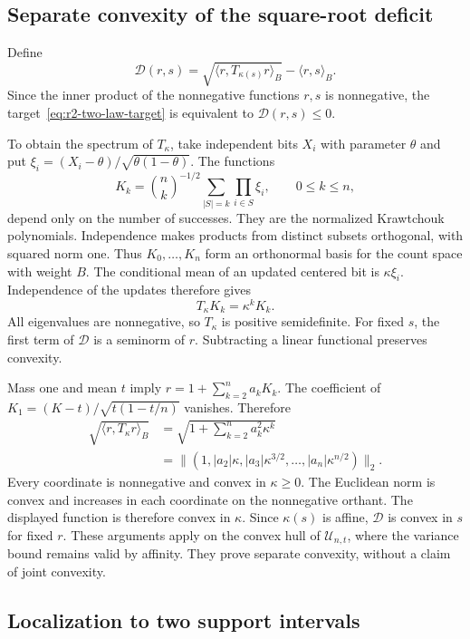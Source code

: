 \documentclass[11pt,a4paper]{article}
\theoremstyle{definition}
\theoremstyle{remark}
\begin{document}
\subsection{Separate convexity of the square-root deficit}

Define
\[
 \mathcal D(r,s)=\sqrt{\langle r,T_{\kappa(s)}r\rangle_B}
                 -\langle r,s\rangle_B.
\]
Since the inner product of the nonnegative functions $r,s$ is nonnegative,
the target~\eqref{eq:r2-two-law-target} is equivalent to $\mathcal D(r,s)\le0$.

To obtain the spectrum of $T_\kappa$, take independent bits $X_i$ with parameter $\theta$ and put
$\xi_i=(X_i-\theta)/\sqrt{\theta(1-\theta)}$.
The functions
\[
 K_k=\binom nk^{-1/2}\sum_{|S|=k}\prod_{i\in S}\xi_i,
 \qquad 0\le k\le n,
\]
depend only on the number of successes.
They are the normalized Krawtchouk polynomials.
Independence makes products from distinct subsets orthogonal, with squared norm one.
Thus $K_0,\ldots,K_n$ form an orthonormal basis for the count space with weight $B$.
The conditional mean of an updated centered bit is $\kappa\xi_i$.
Independence of the updates therefore gives
\[
 T_\kappa K_k=\kappa^kK_k.
\]
All eigenvalues are nonnegative, so $T_\kappa$ is positive semidefinite.
For fixed $s$, the first term of $\mathcal D$ is a seminorm of $r$.
Subtracting a linear functional preserves convexity.

Mass one and mean $t$ imply
$r=1+\sum_{k=2}^n a_kK_k$.
The coefficient of $K_1=(K-t)/\sqrt{t(1-t/n)}$ vanishes.
Therefore
\begin{align*}
 \sqrt{\langle r,T_\kappa r\rangle_B}
 &=\sqrt{1+\sum_{k=2}^n a_k^2\kappa^k}\\
 &=\bigl\|(1,|a_2|\kappa,|a_3|\kappa^{3/2},\ldots,|a_n|\kappa^{n/2})\bigr\|_2.
\end{align*}
Every coordinate is nonnegative and convex in $\kappa\ge0$.
The Euclidean norm is convex and increases in each coordinate on the nonnegative orthant.
The displayed function is therefore convex in $\kappa$.
Since $\kappa(s)$ is affine, $\mathcal D$ is convex in $s$ for fixed $r$.
These arguments apply on the convex hull of $\mathcal U_{n,t}$, where the variance bound remains valid by affinity.
They prove separate convexity, without a claim of joint convexity.

\subsection{Localization to two support intervals}
\end{document}
